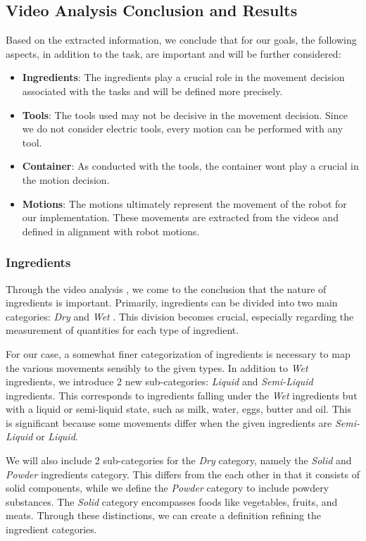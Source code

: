 \subsection*{Video Analysis Conclusion and Results}

Based on the extracted information, we conclude that for our goals, the following aspects, in addition to the task, are important and will be further considered:
\begin{itemize}
  \item \textbf{Ingredients}: The ingredients play a crucial role in the movement decision associated with the tasks and will be defined more precisely.
  \item \textbf{Tools}: The tools used may not be decisive in the movement decision. Since we do not consider electric tools, every motion can be performed with any tool.
  \item \textbf{Container}: As conducted with the tools, the container wont play a crucial in the motion decision. 
  \item \textbf{Motions}: The motions ultimately represent the movement of the robot for our implementation. These movements are extracted from the videos and defined in alignment with robot motions.
\end{itemize}

\subsubsection{Ingredients}
Through the video analysis , we come to the conclusion that the nature of ingredients is important. 
Primarily, ingredients can be divided into two main categories: \textit{Dry} and \textit{Wet} \cite{Ohene2017}. 
This division becomes crucial, especially regarding the measurement of quantities for each type of ingredient.

For our case, a somewhat finer categorization of ingredients is necessary to map the various movements sensibly to the given types. 
In addition to \textit{Wet} ingredients, we introduce 2 new sub-categories: \textit{Liquid} and \textit{Semi-Liquid} ingredients. 
This corresponds to ingredients falling under the \textit{Wet} ingredients but with a liquid or semi-liquid state, such as milk, water, eggs, butter and oil. 
This is significant because some movements differ when the given ingredients are \textit{Semi-Liquid} or \textit{Liquid}.

We will also include 2 sub-categories for the \textit{Dry} category, namely the \textit{Solid} and \textit{Powder} ingredients category. 
This differs from the each other in that it consists of solid components, while we define the \textit{Powder} category to include powdery substances. The \textit{Solid} category encompasses foods like vegetables, fruits, and meats. 
Through these distinctions, we can create a definition refining the ingredient categories.

